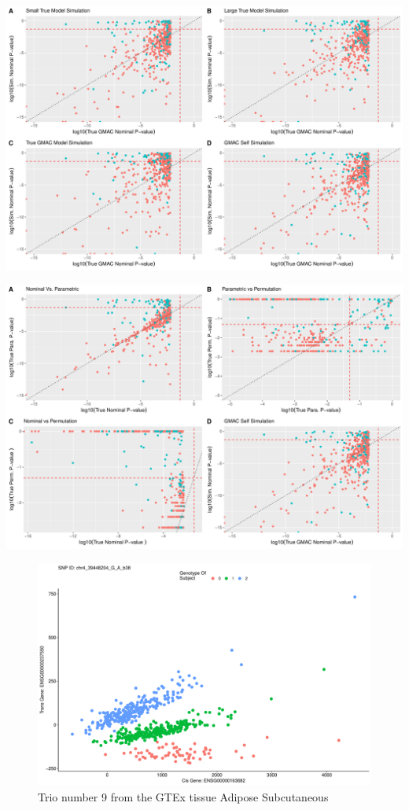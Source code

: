 \documentclass[
]{article}
\begin{document}
\includegraphics{12_15_2021_GMAC_plots_all_trios_files/figure-latex/unnamed-chunk-6-1.pdf}

\includegraphics{12_15_2021_GMAC_plots_all_trios_files/figure-latex/unnamed-chunk-7-1.pdf}

\begin{figure}
\centering
\includegraphics{12_15_2021_GMAC_plots_all_trios_files/figure-latex/unnamed-chunk-8-1.pdf}
\caption{Trio number 9 from the GTEx tissue Adipose Subcutaneous}
\end{figure}
\end{document}
